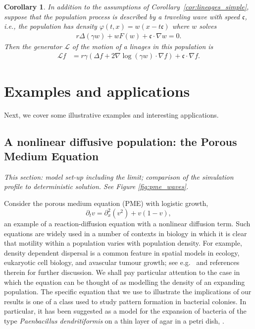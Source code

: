 \documentclass[12pt]{article}
\newtheorem{corollary}[theorem]{Corollary}
\newcommand{\grad}{\nabla}
\newcommand{\wavespeed}{\mathfrak{c}}    %
\newcommand{\Lgen}{\mathcal{L}}    %
\newcommand{\comment}[1]{{\color{blue} \it #1}}
\begin{document}
\begin{corollary} \label{cor:wavefront}
    In addition to the assumptions of Corollary~\ref{cor:lineages_simple},
    suppose that the population process is described by a traveling wave with speed $\wavespeed$,
    i.e., the population has density
    $\varphi(t, x) = w(x - t \wavespeed)$
    where $w$ solves
    \begin{align*}
        r \Delta (\gamma w) + w F(w) + \wavespeed \cdot \grad w = 0 .
    \end{align*}
    Then the generator $\Lgen$
    of the motion of a linages in this population is
    \begin{align}
        \Lgen f
        &=
        r \gamma
        \left(
            \Delta f
            +
            2 \grad \log (\gamma w)
            \cdot \grad f
        \right)
        + \wavespeed \cdot \grad f .
    \end{align}
\end{corollary}


\section{Examples and applications}

Next,
we cover some illustrative examples
and interesting applications.

\subsection{A nonlinear diffusive population: the Porous Medium Equation}

\comment{
    This section:
    model set-up including the limit;
    comparison of the simulation profile to deterministic solution.
    See Figure \ref{fig:pme_waves}.
}

Consider the porous medium equation (PME) with logistic growth,
\begin{equation}
    \label{eqn:pme}
    \partial_t v = \partial_x^2 (v^2) + v (1 - v) ,
\end{equation}
an example of a reaction-diffusion equation with a nonlinear diffusion term.
Such equations are widely used in a number of contexts in biology in which
it is clear that motility within a population varies with population density.
For example, density dependent dispersal is a common feature in spatial
models in ecology, eukaryotic cell biology, and avascular tumour growth;
see e.g.~\cite{sherratt:2010} and references therein for further discussion. 
We shall pay particular attention to the case in which the equation can be 
thought of as modelling the density of an expanding population. 
The specific equation that we use to illustrate the implications of
our results is one of a class used to study pattern formation in 
bacterial colonies. In particular, it has been suggested as a model for
the expansion of bacteria of the type {\em Paenbacillus dendritiformis} on
a thin layer of agar in a petri dish, 
\cite{cohen/golding/kozlovsky/benjacob/ron:1999}. 
\end{document}
